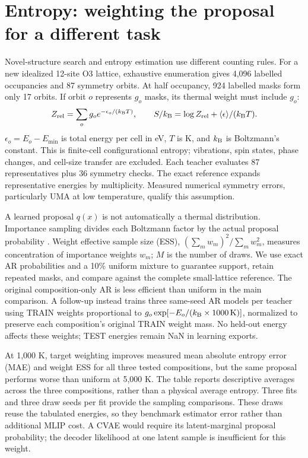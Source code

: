 \documentclass[11pt]{article}
\newcommand{\kb}{k_{\rm B}}
\begin{document}
\section{Entropy: weighting the proposal for a different task}
Novel-structure search and entropy estimation use different counting rules.
For a new idealized 12-site O3 lattice, exhaustive enumeration gives 4,096
labelled occupancies and 87 symmetry orbits. At half occupancy, 924 labelled
masks form only 17 orbits. If orbit $o$ represents $g_o$ masks, its thermal
weight must include $g_o$:
\begin{equation}
Z_{\rm rel}=\sum_o g_o e^{-\epsilon_o/(\kb T)},\qquad
S/\kb=\log Z_{\rm rel}+\langle\epsilon\rangle/(\kb T).
\end{equation}
$\epsilon_o=E_o-E_{\min}$ is total energy per cell in eV, $T$ is K, and
$\kb$ is Boltzmann's constant. This is finite-cell configurational entropy;
vibrations, spin states, phase changes, and cell-size transfer are excluded.
Each teacher evaluates 87 representatives plus 36 symmetry checks. The exact
reference expands representative energies by multiplicity. Measured numerical
symmetry errors, particularly UMA at low temperature, qualify this assumption.

A learned proposal $q(x)$ is not automatically a thermal distribution.
Importance sampling divides each Boltzmann factor by the actual proposal
probability \cite{owen}. Weight effective sample size (ESS),
$(\sum_mw_m)^2/\sum_mw_m^2$, measures concentration of importance weights
$w_m$; $M$ is the number of draws. We use exact AR probabilities and a 10\% uniform
mixture to guarantee support, retain repeated masks, and compare against the
complete small-lattice reference. The original composition-only AR is less
efficient than uniform in the main comparison. A follow-up instead trains
three same-seed AR models per teacher using TRAIN weights proportional to
$g_o\exp[-E_o/(\kb\times1000\,\mathrm K)]$, normalized to preserve each
composition's original TRAIN weight mass. No held-out energy affects these
weights; TEST energies remain NaN in learning exports.



At 1,000 K, target weighting improves measured mean absolute entropy error
(MAE) and weight ESS
for all three tested compositions, but the same proposal performs worse than
uniform at 5,000 K. The table reports descriptive averages across the three
compositions, rather than a physical average entropy. Three fits and three
draw seeds per fit provide the sampling comparisons. These draws reuse the
tabulated energies, so they benchmark estimator error rather than additional
MLIP cost. A CVAE would require its latent-marginal proposal probability;
the decoder likelihood at one latent sample is insufficient for this weight.
\end{document}
